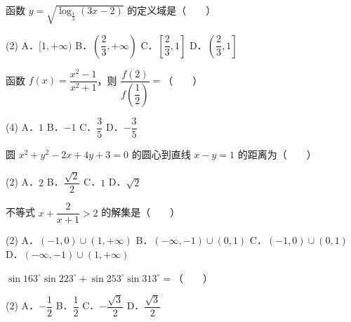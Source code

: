 

\begin{question}
函数 $y = \sqrt{\log_{\frac{1}{2}}(3x - 2)}$ 的定义域是\mbox{（　　）}

\begin{gkopts}(2)
\task A．$[1, +\infty)$
\task B．$\left(\dfrac{2}{3}, +\infty\right)$
\task C．$\left[\dfrac{2}{3}, 1\right]$
\task D．$\left(\dfrac{2}{3}, 1\right]$
\end{gkopts}

\end{question}
\begin{question}
函数 $f(x) = \dfrac{x^2 - 1}{x^2 + 1}$，则 $\dfrac{f(2)}{f\left(\dfrac{1}{2}\right)} =$\mbox{（　　）}

\begin{gkopts}(4)
\task A．$1$
\task B．$-1$
\task C．$\dfrac{3}{5}$
\task D．$-\dfrac{3}{5}$
\end{gkopts}

\end{question}
\begin{question}
圆 $x^2 + y^2 - 2x + 4y + 3 = 0$ 的圆心到直线 $x - y = 1$ 的距离为\mbox{（　　）}

\begin{gkopts}(2)
\task A．$2$
\task B．$\dfrac{\sqrt{2}}{2}$
\task C．$1$
\task D．$\sqrt{2}$
\end{gkopts}

\end{question}
\begin{question}
不等式 $x + \dfrac{2}{x + 1} > 2$ 的解集是\mbox{（　　）}

\begin{gkopts}(2)
\task A．$(-1, 0) \cup (1, +\infty)$
\task B．$(-\infty, -1) \cup (0, 1)$
\task C．$(-1, 0) \cup (0, 1)$
\task D．$(-\infty, -1) \cup (1, +\infty)$
\end{gkopts}

\end{question}
\begin{question}
$\sin 163^\circ \sin 223^\circ + \sin 253^\circ \sin 313^\circ =$\mbox{（　　）}

\begin{gkopts}(2)
\task A．$-\dfrac{1}{2}$
\task B．$\dfrac{1}{2}$
\task C．$-\dfrac{\sqrt{3}}{2}$
\task D．$\dfrac{\sqrt{3}}{2}$
\end{gkopts}

\end{question}
